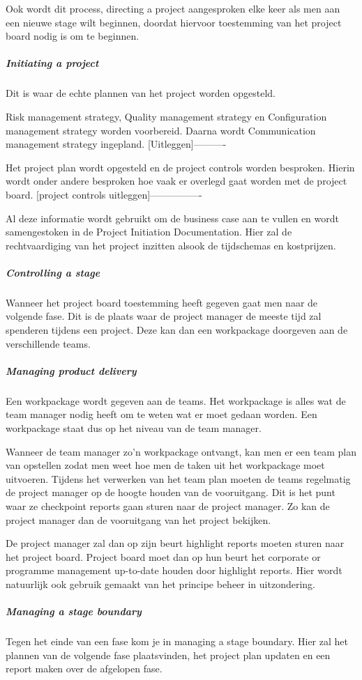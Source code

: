 \documentclass[]{article}
\begin{document}
Ook wordt dit process, directing a project aangesproken elke keer als men aan een nieuwe stage wilt beginnen, doordat hiervoor toestemming van het project board nodig is om te beginnen.

\subparagraph{Initiating a project}
Dit is waar de echte plannen van het project worden opgesteld.

Risk management strategy, Quality management strategy en Configuration management strategy worden voorbereid. Daarna wordt Communication management strategy ingepland. 
[Uitleggen]----------

Het project plan wordt opgesteld en de project controls worden besproken. Hierin wordt onder andere besproken hoe vaak er overlegd gaat worden met de project board.
[project controls uitleggen]----------------

Al deze informatie wordt gebruikt om de business case aan te vullen en wordt samengestoken in de Project Initiation Documentation. Hier zal de rechtvaardiging van het project inzitten alsook de tijdschemas en kostprijzen.

\subparagraph{Controlling a stage}
Wanneer het project board toestemming heeft gegeven gaat men naar de volgende fase. Dit is de plaats waar de project manager de meeste tijd zal spenderen tijdens een project. Deze kan dan een workpackage doorgeven aan de verschillende teams.

\subparagraph{Managing product delivery}
Een workpackage wordt gegeven aan de teams. Het workpackage is alles wat de team manager nodig heeft om te weten wat er moet gedaan worden. Een workpackage staat dus op het niveau van de team manager. 

Wanneer de team manager zo’n workpackage ontvangt, kan men er een team plan van opstellen zodat men weet hoe men de taken uit het workpackage moet uitvoeren. Tijdens het verwerken van het team plan moeten de teams regelmatig de project manager op de hoogte houden van de vooruitgang. Dit is het punt waar ze checkpoint reports gaan sturen naar de project manager. Zo kan de project manager dan de vooruitgang van het project bekijken. 

De project manager zal dan op zijn beurt highlight reports moeten sturen naar het project board. Project board moet dan op hun beurt het corporate or programme management up-to-date houden door highlight reports. Hier wordt natuurlijk ook gebruik gemaakt van het principe beheer in uitzondering.

\subparagraph{Managing a stage boundary}
Tegen het einde van een fase kom je in managing a stage boundary. Hier zal het plannen van de volgende fase plaatsvinden, het project plan updaten en een report maken over de afgelopen fase. 
\end{document}
